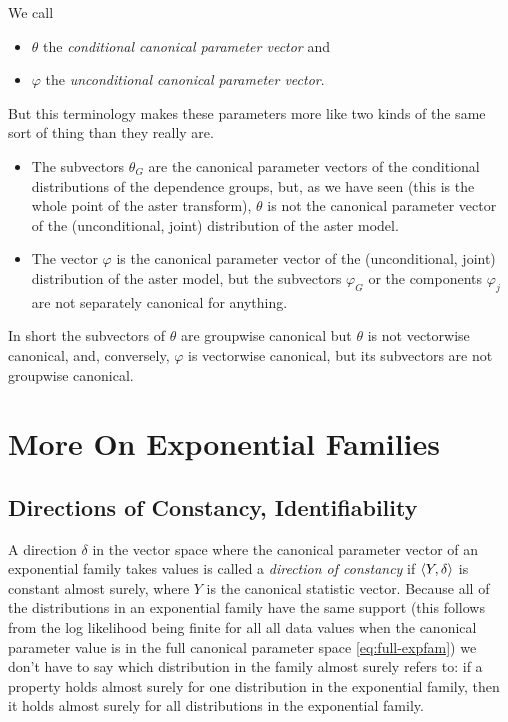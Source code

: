 We call
\begin{itemize}
\item $\theta$ the \emph{conditional canonical parameter vector} and
\item $\varphi$ the \emph{unconditional canonical parameter vector}.
\end{itemize}
But this terminology makes these parameters more like two kinds of the
same sort of thing than they really are.
\begin{itemize}
\item The subvectors $\theta_G$ are the canonical parameter vectors of
    the conditional distributions of the dependence groups, but, as
    we have seen (this is the whole point of the aster transform),
    $\theta$ is not the canonical parameter vector of the (unconditional,
    joint) distribution of the aster model.
\item The vector $\varphi$ is the canonical parameter vector of the
    (unconditional, joint)
    distribution of the aster model, but the subvectors $\varphi_G$ or the
    components $\varphi_j$ are not separately canonical for anything.
\end{itemize}
In short the subvectors of $\theta$ are groupwise canonical but
$\theta$ is not vectorwise canonical, and, conversely,
$\varphi$ is vectorwise canonical, but its subvectors are not groupwise
canonical.

\section{More On Exponential Families}

\subsection{Directions of Constancy, Identifiability}
\label{sec:direction-of-constancy}

A direction $\delta$ in the vector space where the canonical parameter vector
of an exponential family takes values is called a \emph{direction of constancy}
if $\langle Y, \delta \rangle$ is constant almost surely, where $Y$ is the canonical
statistic vector.
Because all of the distributions in an exponential family have
the same support (this follows from the log likelihood being finite for
all all data values when the canonical parameter value is in the full
canonical parameter space \eqref{eq:full-expfam}) we don't have to say
which distribution in the family almost surely refers to: if a property
holds almost surely for one distribution in the exponential family,
then it holds almost surely for all distributions in the exponential family.

